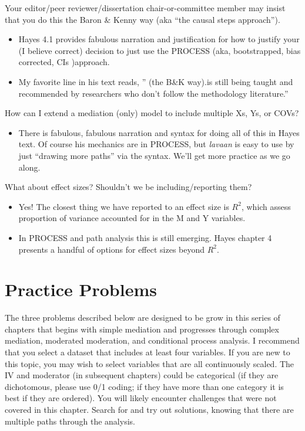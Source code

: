 \documentclass[
]{book}
\providecommand{\tightlist}{%
  \setlength{\itemsep}{0pt}\setlength{\parskip}{0pt}}
\begin{document}
Your editor/peer reviewer/dissertation chair-or-committee member may insist that you do this the Baron \& Kenny way (aka ``the causal steps approach'').

\begin{itemize}
\tightlist
\item
  Hayes 4.1 \citeyearpar{hayes_introduction_2018} provides fabulous narration and justification for how to justify your (I believe correct) decision to just use the PROCESS (aka, bootstrapped, bias corrected, CIs )approach.
\item
  My favorite line in his text reads, '' (the B\&K way).is still being taught and recommended by researchers who don't follow the methodology literature.''
\end{itemize}

How can I extend a mediation (only) model to include multiple Xs, Ys, or COVs?

\begin{itemize}
\tightlist
\item
  There is fabulous, fabulous narration and syntax for doing all of this in Hayes text. Of course his mechanics are in PROCESS, but \emph{lavaan} is easy to use by just ``drawing more paths'' via the syntax. We'll get more practice as we go along.
\end{itemize}

What about effect sizes? Shouldn't we be including/reporting them?

\begin{itemize}
\tightlist
\item
  Yes! The closest thing we have reported to an effect size is \(R^2\), which assess proportion of variance accounted for in the M and Y variables.\\
\item
  In PROCESS and path analysis this is still emerging. Hayes chapter 4 presents a handful of options for effect sizes beyond \(R^2\).
\end{itemize}

\hypertarget{practice-problems-5}{%
\section{Practice Problems}\label{practice-problems-5}}

The three problems described below are designed to be grow in this series of chapters that begins with simple mediation and progresses through complex mediation, moderated moderation, and conditional process analysis. I recommend that you select a dataset that includes at least four variables. If you are new to this topic, you may wish to select variables that are all continuously scaled. The IV and moderator (in subsequent chapters) could be categorical (if they are dichotomous, please use 0/1 coding; if they have more than one category it is best if they are ordered). You will likely encounter challenges that were not covered in this chapter. Search for and try out solutions, knowing that there are multiple paths through the analysis.
\end{document}
